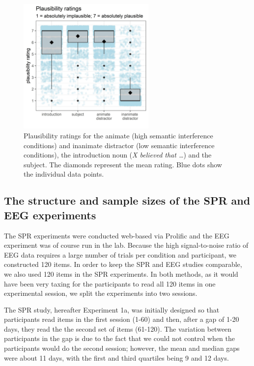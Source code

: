 \documentclass[a4paper, man, floatsintext]{apa7}
\begin{document}
\begin{figure}[H]
\caption{Plausibility ratings for the animate (high semantic interference conditions) and inanimate distractor (low semantic interference conditions), the introduction noun (\textit{X believed that \dots}) and the subject. The diamonds represent the mean rating. Blue dots show the individual data points. }\label{fig:plausibility_rating}
\centering
\includegraphics[width=0.6\textwidth]{images/pandora_plausibility_ratings.jpg}
\end{figure}


\subsection{The structure and sample sizes of the SPR and EEG experiments}

The SPR experiments were conducted web-based via Prolific and the EEG experiment was of course run in the lab.  Because the high signal-to-noise ratio of EEG data requires a large number of trials per condition and participant, we constructed 120 items. In order to keep the SPR and EEG studies comparable, we also used 120 items in the SPR experiments. In both methods, as it would have been very taxing for the participants to read all 120 items in one experimental session, we split the experiments into two sessions. 

The SPR study, hereafter Experiment 1a, was initially designed so that participants read items in the first session (1-60) and then, after a gap of 1-20 days, they read the the second set of items (61-120). The variation between participants in the gap is due to the fact that we could not control when the participants would do the second session; however, the mean and median gaps were  about 11 days, with the first and third quartiles being 9 and 12 days.
\end{document}

